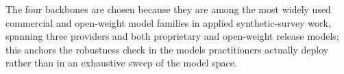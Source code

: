
The four backbones are chosen because they are among the most widely used
commercial and open-weight model families in applied synthetic-survey work,
spanning three providers and both proprietary and open-weight release
models; this anchors the robustness check in the models practitioners
actually deploy rather than in an exhaustive sweep of the model space.



